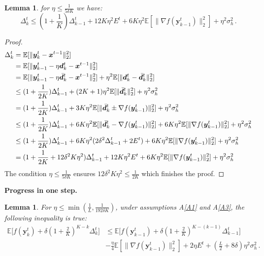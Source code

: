 \documentclass[10pt]{article} %
\theoremstyle{plain}
\newtheorem{lemma}[theorem]{Lemma}
\theoremstyle{definition}
\theoremstyle{remark}
\newcommand{\norm}[1]{\|#1\|_2}
\def\vd{{\bm{d}}}
\def\vx{{\bm{x}}}
\def\vy{{\bm{y}}}
\newcommand{\E}{\mathbb{E}}
\begin{document}
\begin{lemma}\label{lemmaDeltaTK} for $\eta\leq \frac{1}{5\delta K}$ we have:
$$\Delta^t_k \leq (1+\frac{1}{K})\Delta^t_{k-1} + 12 K\eta^2 E^t + 6K\eta^2\E[\norm{\nabla f(\vy^t_{k-1})}^2] + \eta^2 \sigma_h^2\,.$$
\end{lemma}

\begin{proof}
\begin{align*}
    \Delta^t_k &= \E[\norm{\vy^t_k - \vx^{t-1}}^2] \\
    &=\E[\norm{\vy^t_{k-1} - \eta \vd^t_k - \vx^{t-1}}^2]\\
    &=\E[\norm{\vy^t_{k-1} - \eta \Bar{\vd}^t_k - \vx^{t-1}}^2] + \eta^2 \E[\norm{\vd^t_k - \Bar{\vd}^t_k}^2]
    \\&\leq (1+\frac{1}{2K}) \Delta^t_{k-1} + (2K + 1)\eta^2 \E[\norm{\Bar{\vd}^t_k}^2] + \eta^2 \sigma_h^2
    \\&= (1+\frac{1}{2K}) \Delta^t_{k-1} + 3K\eta^2 \E[\norm{\Bar{\vd}^t_k \pm \nabla f(\vy^t_{k-1})}^2] + \eta^2 \sigma_h^2
    \\&\leq (1+\frac{1}{2K}) \Delta^t_{k-1} + 6K\eta^2 \E[\norm{\Bar{\vd}^t_k - \nabla f(\vy^t_{k-1})}^2] + 6K\eta^2 \E[\norm{\nabla f(\vy^t_{k-1})}^2] + \eta^2 \sigma_h^2
    \\&\leq (1+\frac{1}{2K}) \Delta^t_{k-1} + 6K\eta^2 (2\delta^2 \Delta^t_{k-1} + 2 E^t) + 6K\eta^2 \E[\norm{\nabla f(\vy^t_{k-1})}^2] + \eta^2 \sigma_h^2
    \\&= (1+\frac{1}{2K} + 12\delta^2 K \eta^2) \Delta^t_{k-1} + 12K\eta^2  E^t + 6K\eta^2 \E[\norm{\nabla f(\vy^t_{k-1})}^2] + \eta^2 \sigma_h^2
\end{align*}
The condition $\eta\leq \frac{1}{5\delta K}$ ensures $12\delta^2 K \eta^2 \leq \frac{1}{2K}$ which finishes the proof.

\end{proof}

\textbf{Progress in one step.}
\begin{lemma}\label{POneStep}
For $\eta \leq \min(\frac{1}{L}, \frac{1}{192\delta K})$, under assumptions A\ref{A1} and A\ref{A3}, the following inequality is true:
\begin{align*}
   \E\big[f(\vy^t_k) + \delta (1 + \frac{2}{K})^{K-k}\Delta^t_k\big] &\leq \E\big[f(\vy^t_{k-1}) + \delta (1 + \frac{2}{K})^{K-(k-1)}\Delta^t_{k-1}\big] \\&- \frac{\eta}{4}\E[\norm{\nabla f(\vy^t_{k-1})}^2] + 2 \eta E^t + (\frac{L}{2}+8\delta)\eta^2\sigma_h^2\, . 
\end{align*}
\end{lemma}
\end{document}
